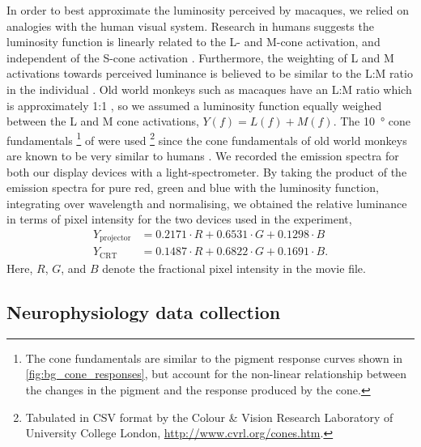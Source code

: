 In order to best approximate the luminosity perceived by macaques, we relied on analogies with the human visual system.
Research in humans suggests the luminosity function is linearly related to the L- and M-cone activation, and independent of the S-cone activation \citep{Stockman2008}.
Furthermore, the weighting of L and M activations towards perceived luminance is believed to be similar to the L:M ratio in the individual \citep{Stockman2008}.
Old world monkeys such as macaques have an L:M ratio which is approximately 1:1 \citep{Dobkins2000}, so we assumed a luminosity function equally weighed between the L and M cone activations, $Y(f) = L(f) + M(f)$.
The \SI{10}{\degree} cone fundamentals%
\footnote{The cone fundamentals are similar to the pigment response curves shown in \autoref{fig:bg_cone_responses}, but account for the non-linear relationship between the changes in the pigment and the response produced by the cone.}
of \citet{Stockman2000} were used%
\footnote{Tabulated in CSV format by the Colour \& Vision Research Laboratory of University College London, \url{http://www.cvrl.org/cones.htm}.}
since the cone fundamentals of old world monkeys are known to be very similar to humans \citep{Dobkins2000}.
We recorded the emission spectra for both our display devices with a light-spectrometer.
By taking the product of the emission spectra for pure red, green and blue with the luminosity function, integrating over wavelength and normalising, we obtained the relative luminance in terms of pixel intensity for the two devices used in the experiment,
\begin{align}
Y_{\text{projector}} &= 0.2171 \cdot R + 0.6531 \cdot G + 0.1298 \cdot B\\
Y_{\text{CRT}}       &= 0.1487 \cdot R + 0.6822 \cdot G + 0.1691 \cdot B
.\end{align}
Here, $R$, $G$, and $B$ denote the fractional pixel intensity in the movie file.

\subsection{Neurophysiology data collection}

